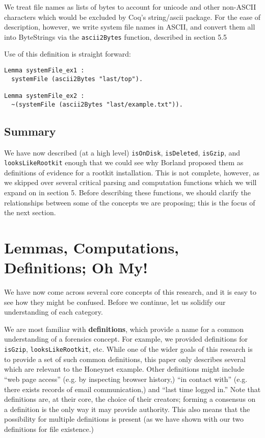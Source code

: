 \documentclass[nocopyrightspace]{sigplanconf}
\begin{document}
We treat file names as lists of bytes to account for unicode and other
non-ASCII characters which would be excluded by Coq's string/ascii package.
For the ease of description, however, we write system file names in ASCII, and
convert them all into ByteStrings via the {\tt ascii2Bytes} function,
described in section 5.5

Use of this definition is straight forward:

\begin{lstlisting}
Lemma systemFile_ex1 : 
  systemFile (ascii2Bytes "last/top").

Lemma systemFile_ex2 : 
  ~(systemFile (ascii2Bytes "last/example.txt")).
\end{lstlisting}

\subsection{Summary}

We have now described (at a high level) {\tt isOnDisk}, {\tt isDeleted},
{\tt isGzip}, and {\tt looksLikeRootkit} enough that we could see why Borland
proposed them as definitions of evidence for a rootkit installation. This is
not complete, however, as we skipped over several critical parsing and
computation functions which we will expand on in section 5. Before describing
these functions, we should clarify the relationships between some of the
concepts we are proposing; this is the focus of the next section.

\section{Lemmas, Computations, Definitions; Oh My!}

We have now come across several core concepts of this research, and it is easy
to see how they might be confused. Before we continue, let us solidify our
understanding of each category.

We are most familiar with {\bf definitions}, which provide a name for a common
understanding of a forensics concept. For example, we provided definitions for
{\tt isGzip}, {\tt looksLikeRootkit}, etc. While one of the wider goals of
this research is to provide a set of such common definitions, this paper only
describes several which are relevant to the Honeynet example. Other
definitions might include ``web page access'' (e.g. by inspecting browser
history,) ``in contact with'' (e.g. there exists records of email
communication,) and ``last time logged in.'' Note that definitions are, at
their core, the choice of their creators; forming a consensus on a definition
is the only way it may provide authority. This also means that the possibility
for multiple definitions is present (as we have shown with our two definitions
for file existence.)
\end{document}
